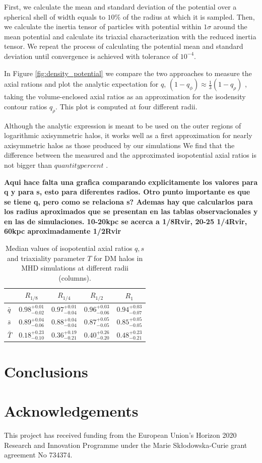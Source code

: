 \documentclass[a4paper,fleqn,usenatbib]{mnras}
\begin{document}
First, we calculate the mean and standard deviation of the potential over a
spherical shell of width equals to $10\%$ of the radius at which it is
sampled. 
Then, we calculate the inertia tensor of particles with potential
within $1\sigma$ around the mean potential and calculate its triaxial
characterization with the reduced inertia tensor. 
We repeat the
process of calculating the potential mean and standard deviation until
convergence is achieved with tolerance of $10^{-4}$. 

In Figure \ref{fig:density_potential} we compare the two approaches to
measure the axial rations and plot the analytic expectation for $q$, 
$(1-q_{\phi})\approx \frac{1}{3}(1-q_{\rho})$
\citep{Binney_and_Tremaine_2008}, taking the volume-enclosed axial
ratios  as an approximation for the isodensity contour ratios
$q_{\rho}$. 
This plot is computed at four different radii.

Although the analytic expression is meant to be used on the outer
regions of logarithmic axisymmetric halos, it works well as a first
approximation for nearly axisymmetric halos as those produced by our
simulations 
We find that the difference between the measured and the
approximated isopotential axial ratios is not bigger than $quantity
percent$ {\bf }. 


{\bf Aqui hace falta una grafica comparando explicitamente los
  valores para q y para s, esto para diferentes radios.
  Otro punto importante es que se tiene q, pero como se
  relaciona s?
  Ademas hay que calcularlos para los radius aproximados que se
  presentan en las tablas observacionales y en las de simulaciones.
  10-20kpc se acerca a 1/8Rvir, 20-25 1/4Rvir, 60kpc aproximadamente 1/2Rvir
}


\begin{table}
\setlength{\tabcolsep}{3pt}
\begin{tabular}{l|cccc}
 & $R_{1/8}$& $R_{1/4}$& $R_{1/2}$& $R_1$ \\
\hline \hline
$\bar{q}$&$0.98^{+0.01}_{-0.02}$&$0.97^{+0.01}_{-0.04}$&$0.96^{+0.03}_{-0.06}$&$0.94^{+0.03}_{-0.07}$ \\[0.1cm]
$\bar{s}$&$0.89^{+0.04}_{-0.06}$&$0.88^{+0.04}_{-0.04}$&$0.87^{+0.05}_{-0.05}$&$0.85^{+0.05}_{-0.05}$ \\[0.1cm]
$\bar{T}$&$0.18^{+0.23}_{-0.10}$&$0.36^{+0.19}_{-0.21}$&$0.40^{+0.26}_{-0.20}$&$0.48^{+0.23}_{-0.21}$ \\[0.1cm]
\hline
\end{tabular}
\caption{Median values of isopotential axial ratios $q,s$ and triaxiality parameter $T$ for DM halos in MHD simulations at different radii (columns). }
\label{tabe:isopotential}
\end{table}


\section{Conclusions}


\section*{Acknowledgements}
This project has received funding from the European Union's Horizon
2020 Research and Innovation Programme under the Marie
Sk\l{}odowska-Curie grant agreement No 734374. 

 
 
\end{document}
